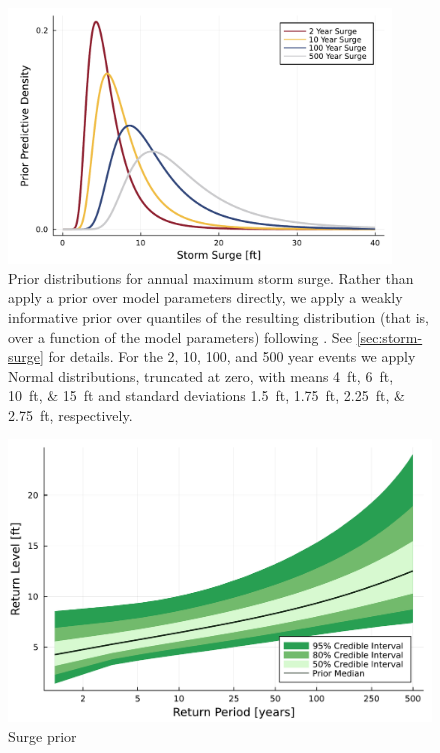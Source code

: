\documentclass[12pt]{article}
\begin{document}
\begin{figure}
    \centering
    \includegraphics[width=4in]{surge-gev-priors}
    \caption{
        Prior distributions for annual maximum storm surge.
        Rather than apply a prior over model parameters directly, we apply a weakly informative prior over quantiles of the resulting distribution (that is, over a function of the model parameters) following \citet{coles_evd:1996}.
        See \cref{sec:storm-surge} for details.
        For the 2, 10, 100, and 500 year events we apply Normal distributions, truncated at zero, with means \SIlist{4;6;10;15}{ft} and standard deviations \SIlist{1.5;1.75;2.25;2.75}{ft}, respectively.
    }\label{fig:surge-gev-priors}
\end{figure}

\begin{figure}
    \centering
    \includegraphics[width=\textwidth]{surge-prior-return}
    \caption{
        Surge prior
    }\label{fig:surge-prior-return}
\end{figure}
\end{document}
